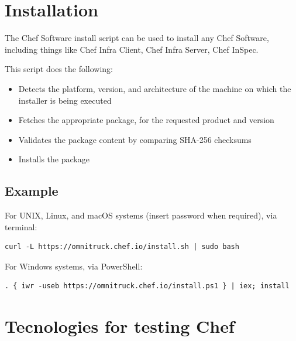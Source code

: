 \documentclass[12pt,a4paper,openright,twoside]{book}
\begin{document}
\section{Installation}
The Chef Software install script can be used to install any Chef Software, including things like Chef Infra Client, Chef Infra Server, Chef InSpec.


This script does the following:
\begin{itemize}
    \item Detects the platform, version, and architecture of the machine on which the installer is being executed
    \item Fetches the appropriate package, for the requested product and version
    \item Validates the package content by comparing SHA-256 checksums
    \item Installs the package
\end{itemize}


\cite{chefDocInstall}

\subsection{Example}

For UNIX, Linux, and macOS systems (insert password when required), via terminal:


\begin{lstlisting}
curl -L https://omnitruck.chef.io/install.sh | sudo bash
\end{lstlisting}


For Windows systems, via PowerShell:
\begin{lstlisting}
. { iwr -useb https://omnitruck.chef.io/install.ps1 } | iex; install
\end{lstlisting}


\cite{chefDocInstall}

\section{Tecnologies for testing Chef}


\end{document}
